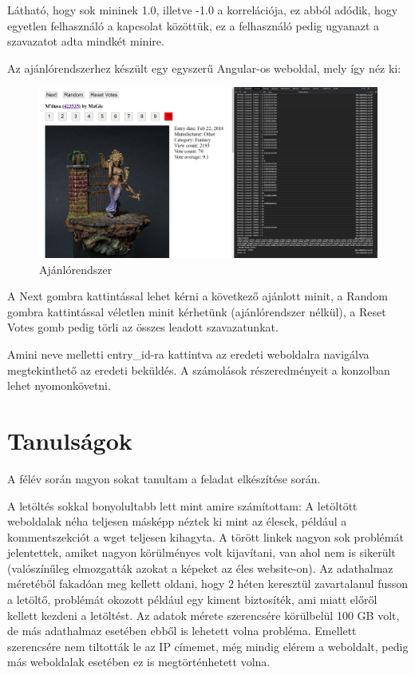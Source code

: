 \documentclass[14pt,a4paper]{article}
\begin{document}
Látható, hogy sok mininek 1.0, illetve -1.0 a korrelációja, ez abból adódik, hogy egyetlen felhasználó
a kapcsolat közöttük, ez a felhasználó pedig ugyanazt a szavazatot adta mindkét minire.

Az ajánlórendszerhez készült egy egyszerű Angular-os weboldal, mely így néz ki:

\begin{figure}[H]
\centering
\includegraphics[width=1.0\columnwidth]{pics/ajanlorendszer.png}
\caption{Ajánlórendszer}
\end{figure}

A Next gombra kattintással lehet kérni a következő ajánlott minit, a Random gombra kattintással
véletlen minit kérhetünk (ajánlórendszer nélkül), a Reset Votes gomb pedig törli az összes leadott
szavazatunkat.

Amini neve melletti entry\_id-ra kattintva az eredeti weboldalra navigálva megtekinthető az eredeti
beküldés. A számolások részeredményeit a konzolban lehet nyomonkövetni.

\section{Tanulságok}

A félév során nagyon sokat tanultam a feladat elkészítése során.

A letöltés sokkal bonyolultabb lett mint amire számítottam: A letöltött weboldalak néha teljesen másképp néztek ki
mint az élesek, például a kommentszekciót a wget teljesen kihagyta. A törött linkek nagyon sok problémát jelentettek,
amiket nagyon körülményes volt kijavítani, van ahol nem is sikerült (valószínűleg elmozgatták azokat a képeket az éles
website-on). Az adathalmaz méretéből fakadóan meg kellett oldani, hogy 2 héten keresztül zavartalanul fusson a letöltő,
problémát okozott például egy kiment biztosíték, ami miatt előről kellett kezdeni a letöltést. Az adatok mérete
szerencsére körülbelül 100 GB volt, de más adathalmaz esetében ebből is lehetett volna probléma. Emellett szerencsére
nem tiltották le az IP címemet, még mindig elérem a weboldalt, pedig más weboldalak esetében ez is megtörténhetett volna.
\end{document}
